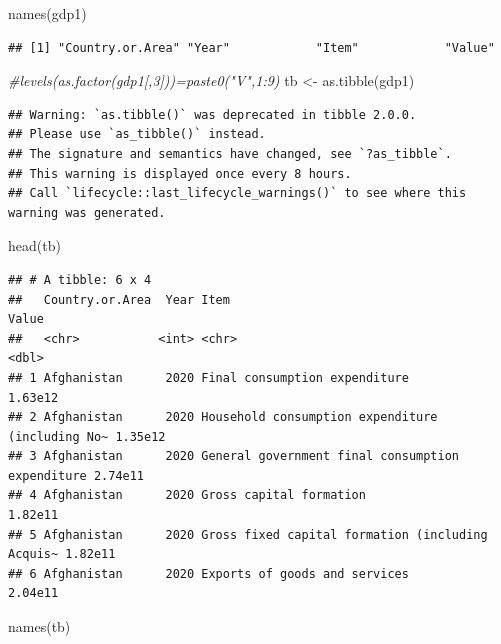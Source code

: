 \documentclass[
]{book}
\newenvironment{Shaded}{\begin{snugshade}}{\end{snugshade}}
\newcommand{\CommentTok}[1]{\textcolor[rgb]{0.56,0.35,0.01}{\textit{#1}}}
\newcommand{\FunctionTok}[1]{\textcolor[rgb]{0.00,0.00,0.00}{#1}}
\newcommand{\NormalTok}[1]{#1}
\newcommand{\OtherTok}[1]{\textcolor[rgb]{0.56,0.35,0.01}{#1}}
\begin{document}
\begin{Shaded}
\begin{Highlighting}[]
\FunctionTok{names}\NormalTok{(gdp1)}
\end{Highlighting}
\end{Shaded}

\begin{verbatim}
## [1] "Country.or.Area" "Year"            "Item"            "Value"
\end{verbatim}

\begin{Shaded}
\begin{Highlighting}[]
\CommentTok{\#levels(as.factor(gdp1[,3]))=paste0("V",1:9)}
\NormalTok{tb }\OtherTok{\textless{}{-}} \FunctionTok{as.tibble}\NormalTok{(gdp1)}
\end{Highlighting}
\end{Shaded}

\begin{verbatim}
## Warning: `as.tibble()` was deprecated in tibble 2.0.0.
## Please use `as_tibble()` instead.
## The signature and semantics have changed, see `?as_tibble`.
## This warning is displayed once every 8 hours.
## Call `lifecycle::last_lifecycle_warnings()` to see where this warning was generated.
\end{verbatim}

\begin{Shaded}
\begin{Highlighting}[]
\FunctionTok{head}\NormalTok{(tb)}
\end{Highlighting}
\end{Shaded}

\begin{verbatim}
## # A tibble: 6 x 4
##   Country.or.Area  Year Item                                               Value
##   <chr>           <int> <chr>                                              <dbl>
## 1 Afghanistan      2020 Final consumption expenditure                    1.63e12
## 2 Afghanistan      2020 Household consumption expenditure (including No~ 1.35e12
## 3 Afghanistan      2020 General government final consumption expenditure 2.74e11
## 4 Afghanistan      2020 Gross capital formation                          1.82e11
## 5 Afghanistan      2020 Gross fixed capital formation (including Acquis~ 1.82e11
## 6 Afghanistan      2020 Exports of goods and services                    2.04e11
\end{verbatim}

\begin{Shaded}
\begin{Highlighting}[]
\FunctionTok{names}\NormalTok{(tb)}
\end{Highlighting}
\end{Shaded}
\end{document}
